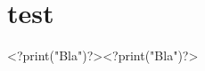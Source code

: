 \documentclass[a4paper,11pt]{article}
\begin{document}
\section{test}
<?print("Bla")?><?print("Bla")?>
\end{document}

